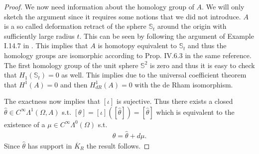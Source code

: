 \documentclass[../master_thesis.tex]{subfiles}
\begin{document}
\begin{proof}
    We now need information about the homology group of $A$. We will only sketch the argument 
    since it requires some notions that we did not introduce. 
    $A$ is a so called deformation retract of the sphere $\mathbb{S}_t$ around the origin
    with sufficiently large radius $t$. 
    This can be seen by following the argument of Example I.14.7 in \cite{topology_and_geometry}. This implies that
    $A$ is homotopy equivalent to $\mathbb{S}_t$ and thus the homology groups are 
    isomorphic according to Prop. IV.6.3 in the same reference. The first homology group of the unit sphere 
    $\mathbb{S}^2$ is zero and thus it is easy to check that $H_1(\mathbb{S}_t) = 0$
    as well.
    This implies due to the universal coefficient 
    theorem that $H^1(A) = 0$ and then $H^1_{dR}(A) = 0$ with the de Rham isomorphism. 
    
    The exactness now implies that 
    $[\iota]$ is sujective. Thus there exists a closed $\hat{\theta}\in C^\infty \Lambda^1(\Omega, A)$
    s.t. 
    $[\theta] = [\iota]([\hat{\theta}]) = [\hat{\theta}]$ which is equivalent to the 
    existence of a $\mu \in C^\infty \Lambda^0 (\Omega)$ s.t. 
    \begin{align*}
        \theta = \hat{\theta} + d\mu.
    \end{align*}
    Since $\hat{\theta}$ has support in $\overline{K}_R$ the result follows.
\end{proof}
\end{document}
